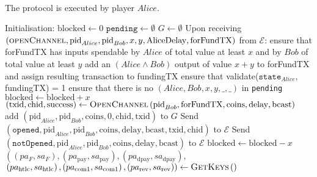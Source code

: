 \ \\  The protocol is executed by player $Alice$.
  \label{alg:lightningprot}
  \begin{algorithmic}[1]
    \State Initialisation:
    \Indent
      \State $\mathrm{blocked} \gets 0$
      \State $\mathtt{pending} \gets \emptyset$
      \State $G \gets \emptyset$
    \EndIndent
    \State
    \State Upon receiving $\left(\textsc{openChannel}, \mathrm{pid}_{Alice},
    \mathrm{pid}_{Bob}, x, y, \mathrm{AliceDelay}, \mathrm{forFundTX}\right)$
    from $\mathcal{E}$:
    \Indent
      \State ensure that forFundTX has inputs spendable by $Alice$ of total
      value at least $x$ and by $Bob$ of total value at least $y$
      \State add an $\left(Alice \wedge Bob\right)$ output of value $x + y$ to
      forFundTX and assign resulting transaction to fundingTX
      \State ensure that validate($\mathtt{state}_{Alice}$, fundingTX) = 1
      \State ensure that there is no $\left(Alice, Bob, x, y, \_, \_\right)$ in
      \texttt{pending}
      \State $\mathrm{blocked} \leftarrow \mathrm{blocked} + x$
      \State $\left(\mathrm{txid}, \mathrm{chid}, \mathrm{success}\right)
      \gets \textsc{OpenChannel}\left(\mathrm{pid}_{Bob}, \mathrm{forFundTX},
      \mathrm{coins}, \mathrm{delay}, \mathrm{bcast}\right)$
        \State add $\left(\mathrm{pid}_{Alice}, \mathrm{pid}_{Bob},
        \mathrm{coins}, 0, \mathrm{chid}, \mathrm{txid}\right)$ to $G$
        \State Send $\left(\mathtt{opened}, \mathrm{pid}_{Alice},
        \mathrm{pid}_{Bob}, \mathrm{coins}, \mathrm{delay}, \mathrm{bcast},
        \mathrm{txid}, \mathrm{chid}\right)$
        \Indent
          \Indent
            \State to $\mathcal{E}$
          \EndIndent
        \EndIndent
      \Else
        \State Send $\left(\mathtt{notOpened}, \mathrm{pid}_{Alice},
        \mathrm{pid}_{Bob}, \mathrm{coins}, \mathrm{delay},
        \mathrm{bcast}\right)$ to $\mathcal{E}$
      \EndIf
      \State $\mathrm{blocked} \leftarrow \mathrm{blocked} - x$
    \EndIndent
    \State
      \State $\left(\left(pa_F, sa_F\right), \left(pa_{\mathrm{pay}},
      sa_{\mathrm{pay}}\right), \left(pa_{\mathrm{dpay}},
      sa_{\mathrm{dpay}}\right),\right.$
      \Indent
        \State $\left.\left(pa_{\mathrm{htlc}}, sa_{\mathrm{htlc}}\right),
        \left(pa_{\mathrm{com}1}, sa_{\mathrm{com}1}\right),
        \left(pa_{\mathrm{rev}}, sa_{\mathrm{rev}}\right)\right) \gets
        \textsc{GetKeys}\left(\right)$

\end{algorithmic}

